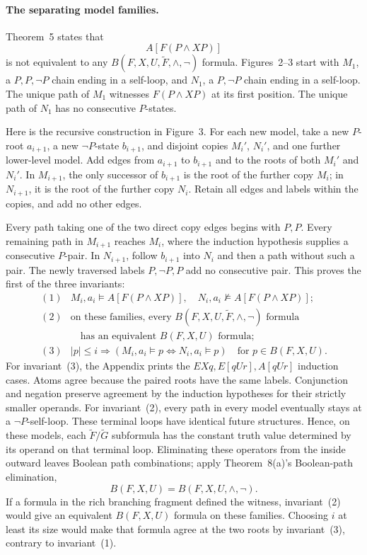 \paragraph{The separating model families.}
Theorem~5 states that
\[
 A[F(P\land XP)]
\]
is not equivalent to any
\(B(F,X,U,\widetilde F,\land,\neg)\) formula.
Figures~2--3 start with
\(M_1\), a \(P,P,\neg P\) chain ending in a self-loop, and \(N_1\), a
\(P,\neg P\) chain ending in a self-loop.
The unique path of \(M_1\) witnesses \(F(P\land XP)\) at its first
position.  The unique path of \(N_1\) has no consecutive \(P\)-states.

Here is the recursive construction in Figure~3.  For each new model,
take a new \(P\)-root \(a_{i+1}\), a new \(\neg P\)-state \(b_{i+1}\),
and disjoint copies \(M_i'\), \(N_i'\), and one further lower-level model.
Add edges from \(a_{i+1}\) to \(b_{i+1}\) and to the roots of both
\(M_i'\) and \(N_i'\).  In \(M_{i+1}\), the only successor of
\(b_{i+1}\) is the root of the further copy \(M_i\); in \(N_{i+1}\),
it is the root of the further copy \(N_i\).  Retain all edges and
labels within the copies, and add no other edges.

Every path taking one of the two direct copy edges begins with \(P,P\).
Every remaining path in \(M_{i+1}\) reaches \(M_i\), where the induction
hypothesis supplies a consecutive \(P\)-pair.  In \(N_{i+1}\), follow
\(b_{i+1}\) into \(N_i\) and then a path without such a pair.
The newly traversed labels \(P,\neg P,P\) add no consecutive pair.
This proves the first of the three invariants:
\[
\begin{array}{ll}
(1)&M_i,a_i\models A[F(P\land XP)],
     \quad
     N_i,a_i\not\models A[F(P\land XP)];\\
(2)&\text{on these families, every }
 B(F,X,U,\widetilde F,\land,\neg)\text{ formula}\\
&\quad\text{has an equivalent }B(F,X,U)\text{ formula};\\
(3)&|p|\leq i\Rightarrow
 (M_i,a_i\models p\Longleftrightarrow N_i,a_i\models p)
 \quad\text{for }p\in B(F,X,U).
\end{array}
\]
For invariant~(3), the Appendix prints the \(EXq,E[qUr],A[qUr]\) induction
cases.  Atoms agree because the paired roots have the same labels.
Conjunction and negation preserve agreement by the induction hypotheses
for their strictly smaller operands.
For invariant~(2), every path in every model eventually stays at a
\(\neg P\)-self-loop.  These terminal loops have identical future
structures.  Hence, on these models, each
\(\widetilde F/\widetilde G\) subformula has the constant truth value
determined by its operand on that terminal loop.  Eliminating these
operators from the inside outward leaves Boolean path combinations;
apply
Theorem~8(a)'s Boolean-path elimination,
\[
 B(F,X,U)=B(F,X,U,\land,\neg).
\]
If a formula in the rich branching fragment defined the witness,
invariant~(2) would give an equivalent \(B(F,X,U)\) formula on these
families.  Choosing \(i\) at least its size would make that formula agree
at the two roots by invariant~(3), contrary to invariant~(1).

